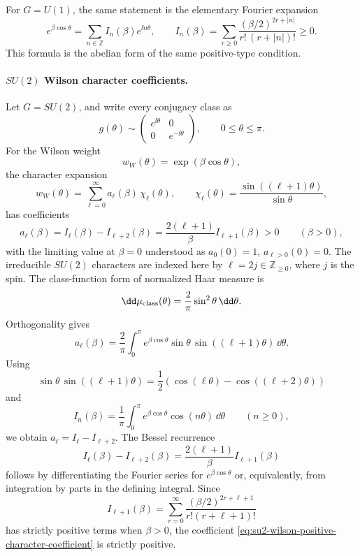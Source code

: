 For \(G=U(1)\), the same statement is the elementary Fourier expansion
\[
  e^{\beta\cos\theta}
  =
  \sum_{n\in\mathbb Z}I_n(\beta)e^{\ii n\theta},
  \qquad
  I_n(\beta)=\sum_{r\geq0}
  \frac{(\beta/2)^{2r+|n|}}{r!\,(r+|n|)!}\geq0 .
\]
This formula is the abelian form of the same positive-type condition.

\paragraph{\(SU(2)\) Wilson character coefficients.}
Let \(G=SU(2)\), and write every conjugacy class as
\[
  g(\theta)\sim
  \begin{pmatrix}e^{\ii\theta}&0\\0&e^{-\ii\theta}\end{pmatrix},
  \qquad 0\leq\theta\leq\pi .
\]
For the Wilson weight
\[
  w_W(\theta)=\exp(\beta\cos\theta),
\]
the character expansion
\[
  w_W(\theta)=\sum_{\ell=0}^{\infty}a_\ell(\beta)\,
  \chi_\ell(\theta),
  \qquad
  \chi_\ell(\theta)=\frac{\sin((\ell+1)\theta)}{\sin\theta},
\]
has coefficients
\begin{equation}
  a_\ell(\beta)
  =
  I_\ell(\beta)-I_{\ell+2}(\beta)
  =
  \frac{2(\ell+1)}{\beta}I_{\ell+1}(\beta)>0
  \qquad(\beta>0),
  \label{eq:su2-wilson-positive-character-coefficient}
\end{equation}
with the limiting value at \(\beta=0\) understood as
\(a_0(0)=1\), \(a_{\ell>0}(0)=0\).
The irreducible \(SU(2)\) characters are indexed here by
\(\ell=2j\in\mathbb Z_{\geq0}\), where \(j\) is the spin.  The class-function
form of normalized Haar measure is
\[
  \dd\mu_{\rm class}(\theta)
  =
  \frac{2}{\pi}\sin^2\theta\,\dd\theta .
\]
Orthogonality gives
\begin{equation}
  a_\ell(\beta)
  =
  \frac{2}{\pi}
  \int_0^\pi
  e^{\beta\cos\theta}
  \sin\theta\,\sin((\ell+1)\theta)\,\dd\theta .
  \label{eq:su2-character-coefficient-integral}
\end{equation}
Using
\[
  \sin\theta\,\sin((\ell+1)\theta)
  =
  \frac12\left(\cos(\ell\theta)-\cos((\ell+2)\theta)\right)
\]
and
\[
  I_n(\beta)=\frac1\pi\int_0^\pi e^{\beta\cos\theta}\cos(n\theta)\,\dd\theta
  \qquad(n\geq0),
\]
we obtain \(a_\ell=I_\ell-I_{\ell+2}\).  The Bessel recurrence
\[
  I_\ell(\beta)-I_{\ell+2}(\beta)
  =
  \frac{2(\ell+1)}{\beta}I_{\ell+1}(\beta)
\]
follows by differentiating the Fourier series for \(e^{\beta\cos\theta}\)
or, equivalently, from integration by parts in the defining integral.  Since
\[
  I_{\ell+1}(\beta)
  =
  \sum_{r=0}^{\infty}
  \frac{(\beta/2)^{2r+\ell+1}}{r!(r+\ell+1)!}
\]
has strictly positive terms when \(\beta>0\), the coefficient
\eqref{eq:su2-wilson-positive-character-coefficient} is strictly positive.

